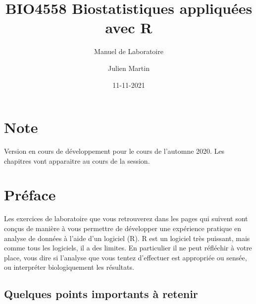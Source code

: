\documentclass[
  12pt,
]{book}
\title{BIO4558 Biostatistiques appliquées avec R}
\subtitle{Manuel de Laboratoire}
\author{Julien Martin}
\date{11-11-2021}
\begin{document}
\maketitle



{
\setcounter{tocdepth}{1}
\tableofcontents
}
\hypertarget{note}{%
\chapter*{Note}\label{note}}

Version en cours de développement pour le cours de l'automne 2020. Les chapitres vont apparaitre au cours de la session.

\hypertarget{pruxe9face}{%
\chapter*{Préface}\label{pruxe9face}}

Les exercices de laboratoire que vous retrouverez dans les pages qui suivent sont conçus de manière à vous permettre de développer une expérience pratique en analyse de données à l'aide d'un logiciel (R).
R est un logiciel très puissant, mais comme tous les logiciels, il a des limites.
En particulier il ne peut réfléchir à votre place, vous dire si l'analyse que vous tentez d'effectuer est appropriée ou sensée, ou interpréter biologiquement les résultats.

\hypertarget{quelques-points-importants-uxe0-retenir}{%
\section*{Quelques points importants à retenir}\label{quelques-points-importants-uxe0-retenir}}
\end{document}
